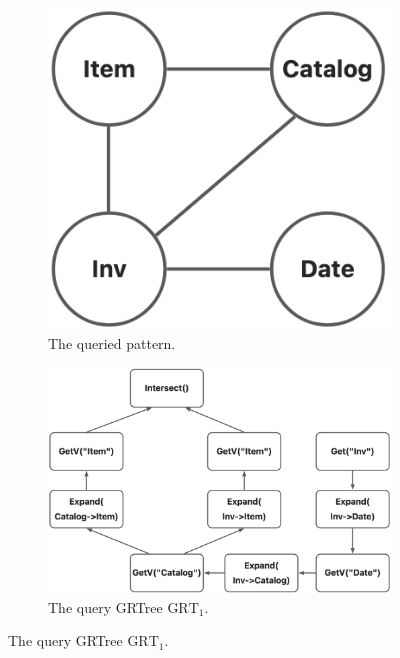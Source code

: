 \documentclass[sigconf, nonacm]{acmart}
\begin{document}
\begin{figure}
    \centering
    \begin{subfigure}[b]{0.15\linewidth}
        \centering
        \includegraphics[width=\linewidth]{./figures/query-grtree-pattern.png}
        \caption{The queried pattern.}
        \label{fig:query-grtree-pattern}
    \end{subfigure}
    \begin{subfigure}[b]{0.35\linewidth}
        \centering
        \includegraphics[width=\linewidth]{./figures/query-grtree.png}
        \caption{The query GRTree $\text{GRT}_1$.}
        \label{fig:query-grtree}

\end{subfigure}
\end{figure}
\end{document}
